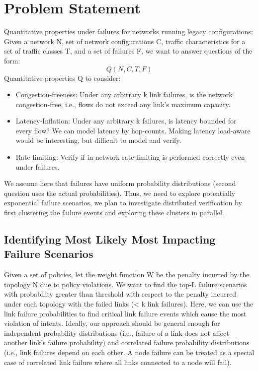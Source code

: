 \documentclass[]{article}
\begin{document}
\section{Problem Statement}
Quantitative properties under failures for networks running legacy configurations:
Given a network N, set of network configurations C, traffic characteristics for a set of traffic classes T, and a set of failures F,  we want to answer questions of the form: 
\[
Q(N, C, T, F)
\]
Quantitative properties Q to consider:
\begin{itemize} 
\item Congestion-freeness: Under any arbitrary k link failures, is the network congestion-free, i.e., flows do not exceed any link’s maximum capacity.
\item Latency-Inflation: Under any arbitrary k failures, is latency bounded for every flow? We can model latency by hop-counts. Making latency load-aware would be interesting, but difficult to model and verify.
\item Rate-limiting: Verify if in-network rate-limiting is performed correctly even under failures.
\end{itemize}
We assume here that failures have uniform probability distributions (second question uses the actual probabilities). Thus, we need to explore potentially exponential failure scenarios, we plan to investigate distributed verification by first clustering the failure events and exploring these clusters in parallel. 

\subsection{Identifying Most Likely Most Impacting Failure Scenarios}
Given a set of policies, let the weight function W be the penalty incurred by the topology N due to policy violations. We want to find the top-L failure scenarios with probability greater than threshold  with respect to the penalty incurred under each topology with the failed links (< k link failures). Here, we can use the link failure probabilities to find critical link failure events which cause the most violation of intents. Ideally, our approach should be general enough for independent probability distributions (i.e., failure of a link does not affect another link’s failure probability) and correlated failure probability distributions (i.e., link failures depend on each other. A node failure can be treated as a special case of correlated link failure where all links connected to a node will fail). 
\end{document}
